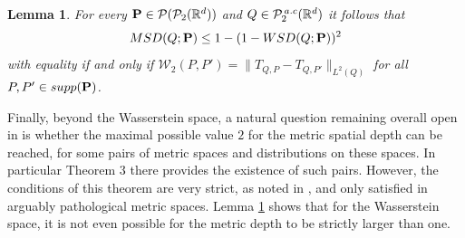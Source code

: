 \documentclass{imsart}
\newtheorem {Lemma}[Proposition] {Lemma}
\numberwithin{equation}{section}
\def\R{\mathbb{R}}
\def\P{\mathbb{P}}
\def\P{\mathbb P}
\def\P{\mathcal{P}}
\def\Ptac{\P^{\rm {\,}a.c}_2}
\begin{document}

\begin{Lemma}\label{lemma:RelationDephts}
	For every ${\bf P}\in \mathcal{P}(\mathcal{P}_2(\R^d)) $ and $Q\in \Ptac(\R^d)$ it follows that 
	$$  {\rm MSD}(Q;{\bf P} ) \leq 1-(1- {\rm WSD}(Q;{\bf P} ))^2$$
	with equality if and only if 
	$ \mathcal{W}_2(P,P')=\|T_{Q,P}-T_{Q,P'}\|_{L^2(Q)} $ for all $P,P'\in {\rm supp}({\bf P})$.  
\end{Lemma}


Finally, beyond the Wasserstein space, a natural question remaining overall open in \cite{virta2023spatial} is whether the maximal possible value $2$ for the metric spatial depth can be reached, for some pairs of metric spaces and distributions on these spaces.
In particular Theorem 3 there 
provides the existence of such pairs. However, the conditions of this theorem
are very strict, as noted in \cite{virta2023spatial}, and only satisfied in arguably pathological metric spaces. Lemma \ref{lemma:RelationDephts} shows that for the Wasserstein space, it is not even possible for the metric depth to be strictly larger than one.
\end{document}
